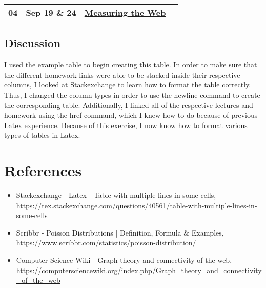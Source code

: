 \documentclass[12pt]{article}
\begin{document}
\begin{table}[h]
\begin{tabular}{|l|l|p{50mm}|p{70mm}|}
04 & Sep 19 \& 24 & \href{https://docs.google.com/presentation/d/1R7CKhxlAv_nQtt_xb1HQotqgSxcVDz58/}{Measuring the Web}  &  \\ \hline
\end{tabular}
\end{table}

\subsection*{Discussion}

I used the example table to begin creating this table. In order to make sure that the different homework links were able to be stacked inside their respective columns, I looked at Stackexchange to learn how to format the table correctly. Thus, I changed the column types in order to use the newline command to create the corresponding table. Additionally, I linked all of the respective lectures and homework using the href command, which I knew how to do because of previous Latex experience. Because of this exercise, I now know how to format various types of tables in Latex.

\section*{References}

\begin{itemize}
    \item {Stackexchange - Latex - Table with multiple lines in some cells, \url{https://tex.stackexchange.com/questions/40561/table-with-multiple-lines-in-some-cells}}
    \item {Scribbr - Poisson Distributions | Definition, Formula \& Examples, \url{https://www.scribbr.com/statistics/poisson-distribution/}}
    \item {Computer Science Wiki - Graph theory and connectivity of the web, \url{https://computersciencewiki.org/index.php/Graph_theory_and_connectivity_of_the_web}}
\end{itemize}
\end{document}
